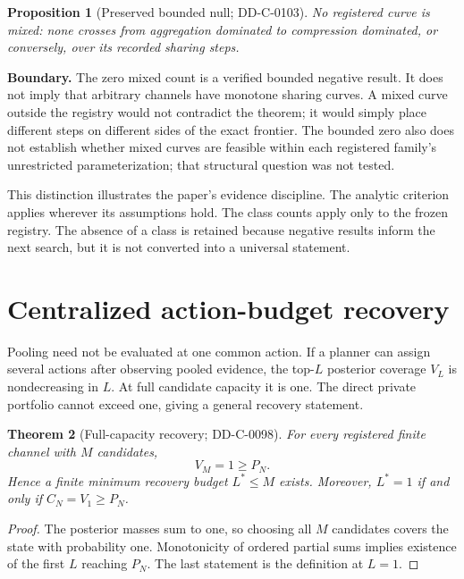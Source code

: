 \documentclass[12pt]{article}
\newcommand{\Boundary}[1]{\par\noindent\textbf{Boundary.} #1\par}
\newtheorem{theorem}{Theorem}
\newtheorem{proposition}[theorem]{Proposition}
\theoremstyle{definition}
\begin{document}


\begin{proposition}[Preserved bounded null; DD-C-0103]
No registered curve is mixed: none crosses from aggregation dominated to
compression dominated, or conversely, over its recorded sharing steps.
\end{proposition}

\Boundary{The zero mixed count is a verified bounded negative result. It does
not imply that arbitrary channels have monotone sharing curves. A mixed curve
outside the registry would not contradict the theorem; it would simply place
different steps on different sides of the exact frontier. The bounded zero also
does not establish whether mixed curves are feasible within each registered
family's unrestricted parameterization; that structural question was not tested.}

This distinction illustrates the paper's evidence discipline. The analytic
criterion applies wherever its assumptions hold. The class counts apply only to
the frozen registry. The absence of a class is retained because negative results
inform the next search, but it is not converted into a universal statement.

\section{Centralized action-budget recovery}

Pooling need not be evaluated at one common action. If a planner can assign
several actions after observing pooled evidence, the top-$L$ posterior coverage
$V_L$ is nondecreasing in $L$. At full candidate capacity it is one. The direct
private portfolio cannot exceed one, giving a general recovery statement.

\begin{theorem}[Full-capacity recovery; DD-C-0098]
For every registered finite channel with $M$ candidates,
\[
 V_M=1\geq P_N.
\]
Hence a finite minimum recovery budget $L^*\leq M$ exists. Moreover,
$L^*=1$ if and only if $C_N=V_1\geq P_N$.
\end{theorem}

\begin{proof}
The posterior masses sum to one, so choosing all $M$ candidates covers the state
with probability one. Monotonicity of ordered partial sums implies existence of
the first $L$ reaching $P_N$. The last statement is the definition at $L=1$.
\end{proof}
\end{document}

